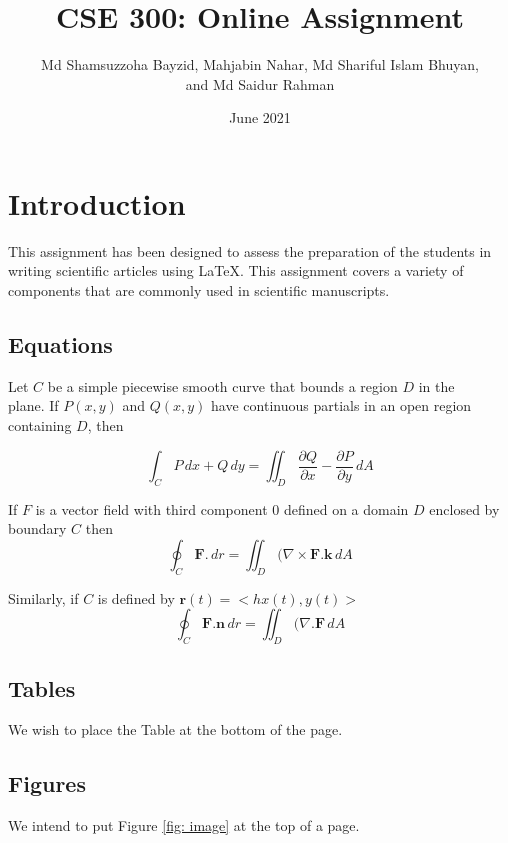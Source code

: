\documentclass[18pt, a4paper]{article} %
\title{CSE 300: Online Assignment}
\author{Md Shamsuzzoha Bayzid, Mahjabin Nahar, Md Shariful Islam Bhuyan,\\
and Md Saidur Rahman}
\date{June 2021}
\begin{document}
    \maketitle
    \section{Introduction}
    This assignment has been designed to assess the preparation of the students
    in writing scientific articles using \LaTeX. This assignment covers a variety of
    components that are commonly used in scientific manuscripts.
    \subsection{Equations}
    Let $C$ be a simple piecewise smooth curve that bounds a region $D$ in the\\
    plane. If $P(x, y)$ and $Q(x, y)$ have continuous partials in an open region\\
    containing $D$, then
    
    $$
       \int_C{}^{} P \,dx  + Q \,dy = \iint_D{}^{} \frac{\partial Q}{\partial x} - \frac{\partial P}{\partial y} \,dA 
    $$
    \par If $F$ is a vector field with third component $0$ defined on a domain $D$
enclosed by boundary $C$ then
    $$
        \oint_C{}^{} \textbf{F}. \,dr = \iint_D{}^{} (\nabla \times \textbf{F.k} \,dA
    $$
    \par Similarly, if $C$ is defined by $\textbf{r}(t) = <hx(t), y(t)>$
     $$
        \oint_C{}^{} \textbf{F.n} \,dr = \iint_D{}^{} (\nabla .\textbf{F} \,dA
    $$
    
    \subsection{Tables}
    We wish to place the Table at the bottom of the page.
    \subsection{Figures}
    We intend to put Figure \ref{fig: image} at the top of a page.
    
    \pagebreak
\end{document}
